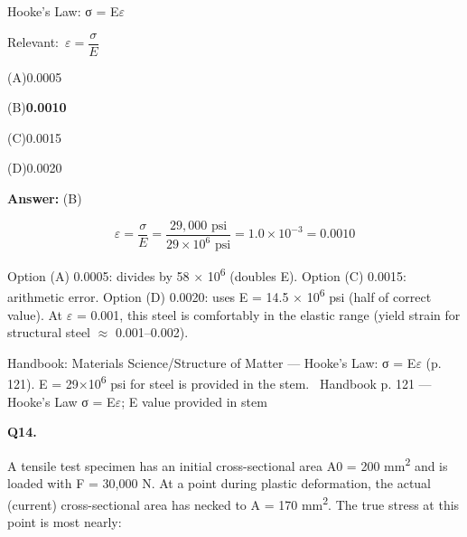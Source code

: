 \documentclass[11pt]{article}
\newcommand{\correct}[1]{\textbf{#1}\;{\color{accent}$\checkmark$}}
\newcommand{\optline}[2]{\par\noindent\hspace{1.2em}(#1)\hspace{0.6em}#2}
\begin{document}
Hooke's Law: σ = E$\varepsilon$\par\vspace{3pt}
{\small\color{soft}Relevant:}\ $\varepsilon = \dfrac{\sigma}{E}$\par\vspace{3pt}
\optline{A}{0.0005}
\optline{B}{\correct{0.0010}}
\optline{C}{0.0015}
\optline{D}{0.0020}
\par\vspace{3pt}
\vspace{2pt}\par\noindent\colorbox{boxbg}{\parbox{\dimexpr\linewidth-2\fboxsep\relax}{%
\vspace{2pt}\textbf{Answer:} (B)\par\vspace{2pt}
{\small \[\varepsilon = \frac{\sigma}{E} = \frac{29{,}000\text{ psi}}{29 \times 10^6\text{ psi}} = 1.0 \times 10^{-3} = 0.0010\]

Option (A) 0.0005: divides by 58 $\times$ 10\textsuperscript{6} (doubles E). Option (C) 0.0015: arithmetic error. Option (D) 0.0020: uses E = 14.5 $\times$ 10\textsuperscript{6} psi (half of correct value). At $\varepsilon$ = 0.001, this steel is comfortably in the elastic range (yield strain for structural steel $\approx$ 0.001--0.002).}\par\vspace{2pt}
{\footnotesize\color{soft}Handbook: Materials Science/Structure of Matter --- Hooke's Law: σ = E$\varepsilon$ (p. 121). E = 29$\times$10\textsuperscript{6} psi for steel is provided in the stem. \textbullet\ Handbook p. 121 --- Hooke's Law σ = E$\varepsilon$; E value provided in stem}\vspace{2pt}
}}
\vspace{9pt}
\filbreak
\textbf{\color{accent}Q14.}\par\vspace{2pt}
A tensile test specimen has an initial cross-sectional area A0 = 200 mm\textsuperscript{2} and is loaded with F = 30,000 N. At a point during plastic deformation, the actual (current) cross-sectional area has necked to A = 170 mm\textsuperscript{2}. The true stress at this point is most nearly:
\end{document}
